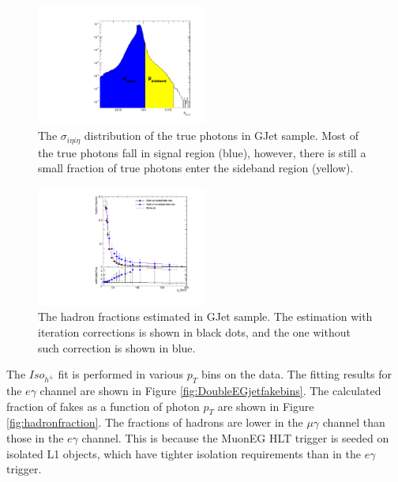 \documentclass[thesis.tex]{subfiles}
\renewcommand\_{\textunderscore\allowbreak}
\begin{document}
\begin{figure}[!hbt]
  \centering
    \includegraphics[width=0.5\textwidth]{Figures/PLOT_Iteration.pdf}
  \caption{The $\sigma_{i\eta i\eta}$ distribution of the true photons in GJet sample. Most of the true photons fall in signal region (blue), however, there is still a small fraction of true photons enter the sideband region (yellow).}
    \label{fig:iteration}
\end{figure}

\begin{figure}[!hbt]
  \centering
    \includegraphics[width=0.5\textwidth]{Figures/JetFakePho_GJet.pdf}
  \caption{The hadron fractions estimated in GJet sample. The estimation with iteration corrections is shown in black dots, and the one without such correction is shown in blue.}
    \label{fig:GJetValidation}
\end{figure}

The $Iso_{h^\pm}$ fit is performed in various $p_T$ bins on the data. The fitting results for the $e\gamma$ channel are shown in Figure \ref{fig:DoubleEGjetfakebins}. The calculated fraction of fakes as a function of photon $p_T$ are shown in Figure \ref{fig:hadronfraction}. The fractions of hadrons are lower in the $\mu\gamma$ channel than those in the $e\gamma$ channel. This is because the MuonEG HLT trigger is seeded on isolated L1 objects, which have tighter isolation requirements than in the $e\gamma$ trigger.
\end{document}
